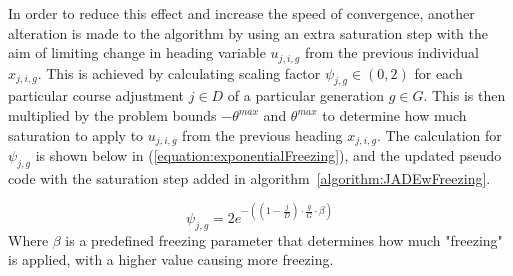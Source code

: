 \documentclass[10pt,a4paper, oneside, conference]{IEEEtran}
\begin{document}
	In order to reduce this effect and increase the speed of convergence, another alteration is made to the algorithm by using an extra saturation step with the aim of limiting change in heading variable $u_{j,i,g}$ from the previous individual $x_{j,i,g}$.
	This is achieved by calculating scaling factor $\psi_{j,g} \in (0,2)$ for each particular course adjustment $j\in D$ of a particular generation $g \in G$. This is then multiplied by the problem bounds $-\theta^{max}$ and $\theta^{max}$ to determine how much saturation to apply to $u_{j,i,g}$ from the previous heading $x_{j,i,g}$. The calculation for $\psi_{j,g}$ is shown below in (\ref{equation:exponentialFreezing}), and the updated pseudo code with the saturation step added in algorithm~\ref{algorithm:JADEwFreezing}. 
	
	\begin{equation}
	\label{equation:exponentialFreezing}
	\psi_{j,g} = 2e^{-((1-\frac{j}{D}) \cdot \frac{g}{G} \cdot \beta)}
	\end{equation}		
	Where $\beta$ is a predefined freezing parameter that determines how much "freezing" is applied, with a higher value causing more freezing.
	
\end{document}
